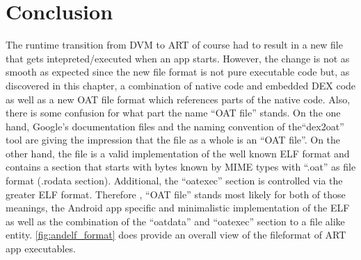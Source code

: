 \section{Conclusion}\label{section:andelf_format_conclusion}
The runtime transition from DVM to ART of course had to result
in a new file that gets intepreted/executed when an app starts.
However, the change is not as smooth as expected since
the new file format is not pure executable code but, as
discovered in this chapter, a combination of native code
and embedded DEX code as well as a new OAT file format
which references parts of the native code. Also, there is some
confusion for what part the name ``OAT file'' stands. On the
one hand, Google's documentation files and the naming
convention of the``dex2oat'' tool are giving the impression
that the file as a whole is an ``OAT file''. On
the other hand, the file is a valid implementation of the
well known ELF format and contains a section that starts
with bytes known by MIME types with ``.oat'' as file format
(.rodata section). Additional, the ``oatexec'' section
is controlled via the greater ELF format. Therefore
, ``OAT file'' stands most likely for both of those meanings, the
Android app specific and minimalistic implementation of the ELF
as well as the combination of the ``oatdata'' and ``oatexec''
section to a file alike entity. \autoref{fig:andelf_format} does
provide an overall view of the fileformat of ART app executables.

